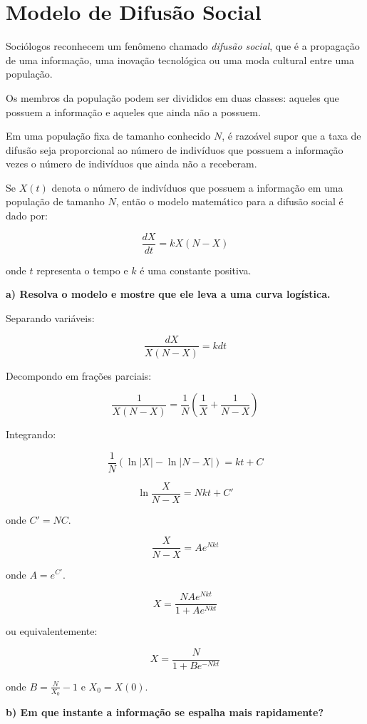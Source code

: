 \documentclass{article}
\begin{document}
\section*{Modelo de Difusão Social}

Sociólogos reconhecem um fenômeno chamado \textit{difusão social}, que é a propagação de uma informação, uma inovação tecnológica ou uma moda cultural entre uma população. 

Os membros da população podem ser divididos em duas classes: aqueles que possuem a informação e aqueles que ainda não a possuem. 

Em uma população fixa de tamanho conhecido $N$, é razoável supor que a taxa de difusão seja proporcional ao número de indivíduos que possuem a informação vezes o número de indivíduos que ainda não a receberam.

Se $X(t)$ denota o número de indivíduos que possuem a informação em uma população de tamanho $N$, então o modelo matemático para a difusão social é dado por:

\[
\frac{dX}{dt} = k X (N - X)
\]

onde $t$ representa o tempo e $k$ é uma constante positiva.

\bigskip

\textbf{a) Resolva o modelo e mostre que ele leva a uma curva logística.}

Separando variáveis:

\[
\frac{dX}{X (N - X)} = k dt
\]

Decompondo em frações parciais:

\[
\frac{1}{X (N - X)} = \frac{1}{N} \left( \frac{1}{X} + \frac{1}{N - X} \right)
\]

Integrando:

\[
\frac{1}{N} \left( \ln |X| - \ln |N - X| \right) = k t + C
\]

\[
\ln \frac{X}{N - X} = N k t + C'
\]

onde $C' = N C$.

\[
\frac{X}{N - X} = A e^{N k t}
\]

onde $A = e^{C'}$.

\[
X = \frac{N A e^{N k t}}{1 + A e^{N k t}}
\]

ou equivalentemente:

\[
X = \frac{N}{1 + B e^{-N k t}}
\]

onde $B = \frac{N}{X_0} - 1$ e $X_0 = X(0)$.

\bigskip

\textbf{b) Em que instante a informação se espalha mais rapidamente?}
\end{document}
